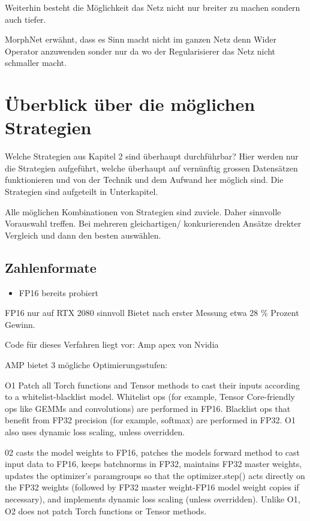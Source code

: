 Weiterhin besteht die Möglichkeit das Netz nicht nur breiter zu machen sondern auch tiefer.


MorphNet erwähnt, dass es Sinn macht nicht im ganzen Netz denn Wider Operator anzuwenden sonder nur da wo der Regularisierer das Netz nicht schmaller macht.


\section{Überblick über die möglichen Strategien}

Welche Strategien aus Kapitel 2 sind überhaupt durchführbar?
Hier werden nur die Strategien aufgeführt, welche überhaupt auf vernünftig grossen Datensätzen funktionieren und von der Technik und dem Aufwand her möglich sind.
Die Strategien sind aufgeteilt in Unterkapitel. 

Alle möglichen Kombinationen von Strategien sind zuviele. Daher sinnvolle Vorauswahl treffen.  
Bei mehreren gleichartigen/ konkurierenden Ansätze drekter Vergleich und dann den besten auswählen.
\subsection{Zahlenformate}

\begin{itemize}
 \item FP16 bereits probiert
\end{itemize}


FP16 nur auf RTX 2080 sinnvoll
Bietet nach erster Messung etwa 28 \% Prozent Gewinn.

Code für dieses Verfahren liegt vor: Amp apex von Nvidia

AMP bietet 3 mögliche Optimierungsstufen:

O1
Patch all Torch functions and Tensor methods to cast their inputs according to a whitelist-blacklist model. Whitelist ops (for example, Tensor Core-friendly ops like GEMMs and convolutions) are performed in FP16. Blacklist ops that benefit from FP32 precision (for example, softmax) are performed in FP32. O1 also uses dynamic loss scaling, unless overridden.

02
casts the model weights to FP16, patches the models forward method to cast input data to FP16, keeps batchnorms in FP32, maintains FP32 master weights, updates the optimizer’s paramgroups so that the optimizer.step() acts directly on the FP32 weights (followed by FP32 master weight-FP16 model weight copies if necessary), and implements dynamic loss scaling (unless overridden). Unlike O1, O2 does not patch Torch functions or Tensor methods.


